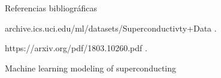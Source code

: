 \documentclass[11pt]{beamer}
\begin{document}
\begin{frame}{Referencias bibliográficas}
	\begin{thebibliography}{10}
	
		\beamertemplateonlinebibitems %
		archive.ics.uci.edu/ml/datasets/Superconductivty+Data
		.
		
		\beamertemplateonlinebibitems %
		https://arxiv.org/pdf/1803.10260.pdf
		.
		
		\beamertemplatearticlebibitems %
		Machine learning modeling of superconducting
		
		
	\end{thebibliography}
\end{frame}
\end{document}
